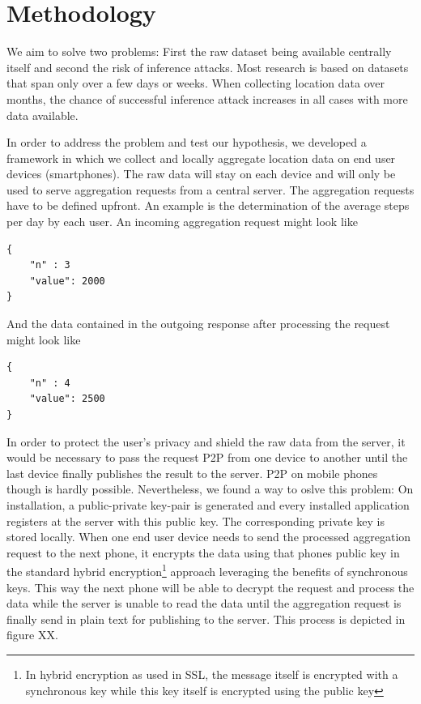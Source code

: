\chapter{Methodology}\label{chapter:method}
We aim to solve two problems: First the raw dataset being available centrally itself and second the risk of inference attacks. Most research is based on datasets that span only over a few days or weeks. When collecting location data over months, the chance of successful inference attack increases in all cases with more data available.

In order to address the problem and test our hypothesis, we developed a framework in which we collect and locally aggregate location data on end user devices (smartphones). The raw data will stay on each device and will only be used to serve aggregation requests from a central server. The aggregation requests have to be defined upfront. An example is the determination of the average steps per day by each user. An incoming aggregation request might look like
\begin{verbatim}
{
	"n" : 3
	"value": 2000
}
\end{verbatim}
And the data contained in the outgoing response after processing the request might look like
\begin{verbatim}
{
	"n" : 4
	"value": 2500
}
\end{verbatim}
 In order to protect the user's privacy and shield the raw data from the server, it would be necessary to pass the request P2P from one device to another until the last device finally publishes the result to the server. P2P on mobile phones though is hardly possible. Nevertheless, we found a way to oslve this problem: On installation, a public-private key-pair is generated and every installed application registers at the server with this public key. The corresponding private key is stored locally. When one end user device needs to send the processed aggregation request to the next phone, it encrypts the data using that phones public key in the standard hybrid encryption\footnote{In hybrid encryption as used in SSL, the message itself is encrypted with a synchronous key while this key itself is encrypted using the public key} approach leveraging the benefits of synchronous keys. This way the next phone will be able to decrypt the request and process the data while the server is unable to read the data until the aggregation request is finally send in plain text for publishing to the server. This process is depicted in figure XX.

